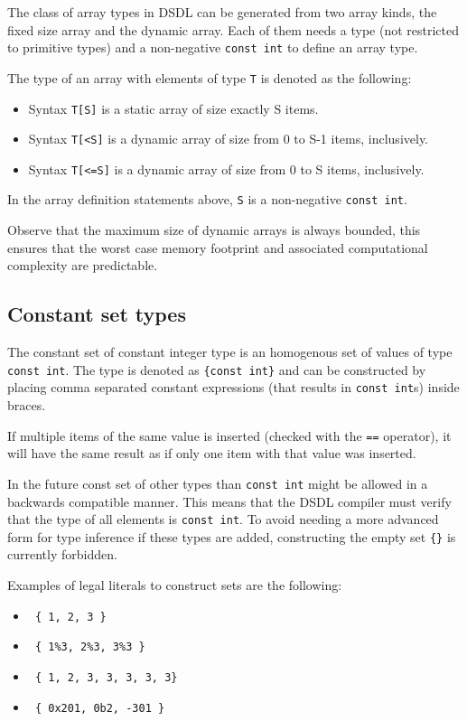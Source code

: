 The class of array types in DSDL can be generated from two array kinds, the fixed size array and the dynamic array.
Each of them needs a type (not restricted to primitive types)
and a non-negative \texttt{const int} to define an array type.

The type of an array with elements of type \verb|T| is denoted as the following:
\begin{itemize}
    \item Syntax \verb|T[S]| is a static array of size exactly S items.
    \item Syntax \verb|T[<S]| is a dynamic array of size from 0 to S-1 items, inclusively.
    \item Syntax \verb|T[<=S]| is a dynamic array of size from 0 to S items, inclusively.
\end{itemize}

In the array definition statements above, \verb|S| is a non-negative \verb|const int|.

Observe that the maximum size of dynamic arrays is always bounded,
this ensures that the worst case memory footprint and associated computational complexity are predictable.

\subsection{Constant set types}
The constant set of constant integer type is an homogenous set of values of type \verb|const int|.
The type is denoted as \verb|{const int}| and can be constructed by placing comma separated constant expressions
(that results in \verb|const int|s) inside braces.

If multiple items of the same value is inserted (checked with the \verb|==| operator),
it will have the same result as if only one item with that value was inserted.

In the future const set of other types than \verb|const int| might be allowed in a backwards compatible manner.
This means that the DSDL compiler must verify that the type of all elements is \verb|const int|.
To avoid needing a more advanced form for type inference if these types are added,
constructing the empty set \verb|{}| is currently forbidden.

Examples of legal literals to construct sets are the following:
\begin{itemize}
    \item \texttt{ \{ 1, 2, 3 \} }
    \item \texttt{ \{ 1\%3, 2\%3, 3\%3 \} }
    \item \texttt{ \{ 1, 2, 3, 3, 3, 3, 3\} }
    \item \texttt{ \{ 0x201, 0b2, -301 \} }
\end{itemize}


